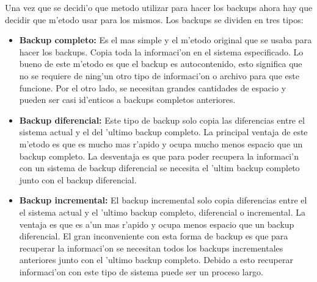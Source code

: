 \documentclass[11pt]{article}
\begin{document}
		Una vez que se decidi'o que metodo utilizar para hacer los backups ahora hay que decidir que m'etodo usar para los mismos. Los backups se dividen en tres tipos:
		\begin{itemize}
			\item \textbf{Backup completo: } Es el mas simple y el m'etodo original que se usaba para hacer los backups. Copia toda la informaci'on en el sistema especificado. Lo bueno de este m'etodo es que el backup es autocontenido, esto significa que no se requiere de ning'un otro tipo de informaci'on o archivo para que este funcione. Por el otro lado, se necesitan grandes cantidades de espacio y pueden ser casi id'enticos a backups completos anteriores.
			\item \textbf{Backup diferencial: } Este tipo de backup solo copia las diferencias entre el sistema actual y el del 'ultimo backup completo. La principal ventaja de este m'etodo es que es mucho mas r'apido y ocupa mucho menos espacio que un backup completo. La desventaja es que para poder recupera la informaci'n con un sistema de backup diferencial se necesita el 'ultim backup completo junto con el backup diferencial.
			\item \textbf{Backup incremental: }El backup incremental solo copia diferencias entre el el sistema actual y el 'ultimo backup completo, diferencial o incremental. La ventaja es que es a'un mas r'apido y ocupa menos espacio que un backup diferencial. El gran inconveniente con esta forma de backup es que para recuperar la informaci'on se necesitan todos los backups incrementales anteriores junto con el 'ultimo backup completo. Debido a esto recuperar informaci'on con este tipo de sistema puede ser un proceso largo.
		\end{itemize}
\end{document}
